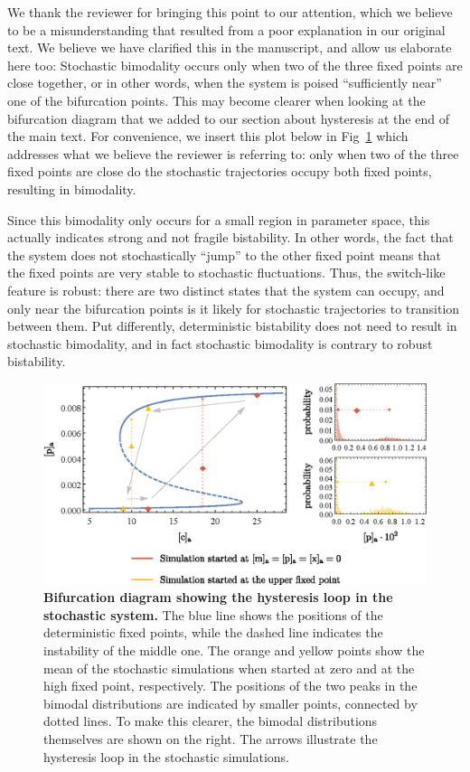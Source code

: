 \documentclass[11pt,letterpaper]{article}
\begin{document}
\begin{response}
We thank the reviewer for bringing this point to our attention, which we
believe to be a misunderstanding that resulted from a poor explanation
in our original text. We believe we have clarified this in the
manuscript, and allow us elaborate here too: Stochastic bimodality occurs
only when two of the three fixed points are close together, or in other
words, when the system is poised ``sufficiently near'' one of the
bifurcation points. This may become clearer when looking at the
bifurcation diagram that we added to our section about hysteresis at the
end of the main text. For convenience, we insert this plot below in
Fig~\ref{bifucation} which addresses what we believe the reviewer is
referring to: only when two of the three fixed points are close do the
stochastic trajectories occupy both fixed points, resulting in
bimodality.

Since this bimodality only occurs for a small region in parameter space,
this actually indicates strong and not fragile bistability. In other
words, the fact that the system does not stochastically ``jump'' to the
other fixed point means that the fixed points are very stable to
stochastic fluctuations. Thus, the switch-like feature is robust:
there are two distinct states that the system can occupy, and only near
the bifurcation points is it likely for stochastic trajectories to
transition between them. Put differently, deterministic bistability does
not need to result in stochastic bimodality, and in fact stochastic
bimodality is contrary to robust bistability.
\end{response}

\begin{figure}[h!]
	\centering
	\includegraphics{Fig10_bifurcation.eps}
	\vspace*{0.5em}
	\caption{{\bf Bifurcation diagram showing the hysteresis loop in the stochastic system.}
		The blue line shows the positions of the deterministic fixed points, while the dashed line indicates the instability of the middle one. The orange and yellow points show the mean of the stochastic simulations when started at zero and at the high fixed point, respectively. The positions of the two peaks in the bimodal distributions are indicated by smaller points, connected by dotted lines. To make this clearer, the bimodal distributions themselves are shown on the right. The arrows illustrate the hysteresis loop in the stochastic simulations.}
	\label{bifucation}
\end{figure}
\end{document}
